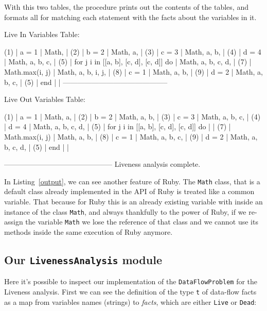\documentclass[a4paper]{article}   %
\begin{document}
With this two tables, the procedure prints out the contents of the tables, and formats all for matching each statement with the facts about the variables in it.

\begin{bash}[frame=tb, label=output, caption={Output of the Liveness Analysis}]

Live In Variables Table:

(1) | a = 1                                  | Math,              |
(2) | b = 2                                  | Math, a,           |
(3) | c = 3                                  | Math, a, b,        |
(4) | d = 4                                  | Math, a, b, c,     |
(5) | for j i in [[a, b], [c, d], [c, d]] do | Math, a, b, c, d,  |
(7) |    Math.max(i, j)                      | Math, a, b, i, j,  |
(8) |    c = 1                               | Math, a, b,        |
(9) |    d = 2                               | Math, a, b, c,     |
(5) | end                                    |                    |
--------------------------------------------

Live Out Variables Table:

(1) | a = 1                                  | Math, a,           |
(2) | b = 2                                  | Math, a, b,        |
(3) | c = 3                                  | Math, a, b, c,     |
(4) | d = 4                                  | Math, a, b, c, d,  |
(5) | for j i in [[a, b], [c, d], [c, d]] do |                    |
(7) |    Math.max(i, j)                      | Math, a, b,        |
(8) |    c = 1                               | Math, a, b, c,     |
(9) |    d = 2                               | Math, a, b, c, d,  |
(5) | end                                    |                    |

---------------------------------------------
Liveness analysis complete.

\end{bash}

In Listing~\ref{output}, we can see another feature of Ruby. The \texttt{Math} class, that is a default class already implemented in the API of Ruby is treated like a common variable. That because for Ruby this is an already existing variable with inside an instance of the class \texttt{Math}, and always thankfully to the power of Ruby, if we re-assign the variable \texttt{Math} we lose the reference of that class and we cannot use its methods inside the same execution of Ruby anymore.

\subsection{Our \texttt{LivenessAnalysis} module}
Here it's possible to inspect our implementation of the \texttt{DataFlowProblem} for the Liveness analysis. First we can see the definition of the type \texttt{t} of data-flow facts as a map from variables names (strings) to \emph{facts}, which are either \texttt{Live} or \texttt{Dead}:
\end{document}
